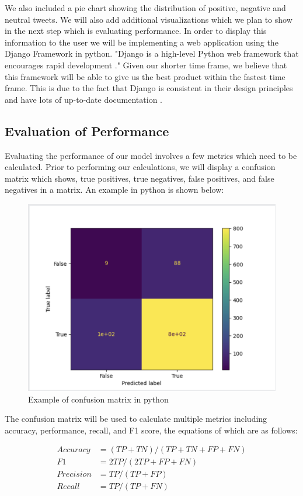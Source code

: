 \documentclass[conference]{IEEEtran}
\begin{document}
 We also included a pie chart showing the distribution of positive, negative and neutral tweets. 
 We will also add additional visualizations which we plan to show in the next step which is evaluating performance.
 In order to display this information to the user we will be implementing a web application using the Django Framework in python. 
 "Django is a high-level Python web framework that encourages rapid development \cite{b14}."
 Given our shorter time frame, we believe that this framework will be able to give us the best product within the fastest time frame.
 This is due to the fact that Django is consistent in their design principles and have lots of up-to-date documentation \cite{b15}. 


\subsection{Evaluation of Performance}
Evaluating the performance of our model involves a few metrics which need to be calculated. 
Prior to performing our calculations, we will display a confusion matrix which shows, true positives, true negatives, false positives, and false negatives in a matrix. 
An example in python is shown below:


\begin{figure}[b]
    \includegraphics[width=0.5 \textwidth]{confusion_matrix.png}
    \caption{Example of confusion matrix in python\cite{b16}}    
\end{figure}
The confusion matrix will be used to calculate multiple metrics including accuracy, performance, recall, and F1 score, the equations of which are as follows:

\begin{align}
    Accuracy &= (TP + TN) / (TP + TN + FP + FN)\\
    F1 &= 2TP / (2TP + FP + FN)\\
    Precision &= TP / (TP + FP)\\
    Recall &= TP / (TP + FN)
\end{align}
\end{document}
